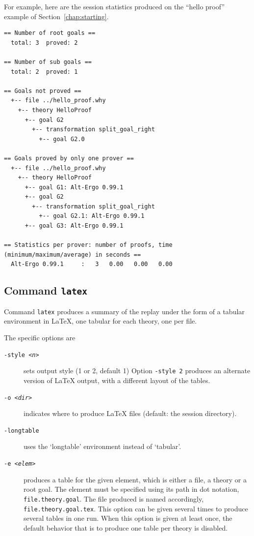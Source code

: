 For example, here are the session statistics produced on the ``hello
proof'' example of Section~\ref{chap:starting}.
{\footnotesize
\begin{verbatim}
== Number of root goals ==
  total: 3  proved: 2

== Number of sub goals ==
  total: 2  proved: 1

== Goals not proved ==
  +-- file ../hello_proof.why
    +-- theory HelloProof
      +-- goal G2
        +-- transformation split_goal_right
          +-- goal G2.0

== Goals proved by only one prover ==
  +-- file ../hello_proof.why
    +-- theory HelloProof
      +-- goal G1: Alt-Ergo 0.99.1
      +-- goal G2
        +-- transformation split_goal_right
          +-- goal G2.1: Alt-Ergo 0.99.1
      +-- goal G3: Alt-Ergo 0.99.1

== Statistics per prover: number of proofs, time (minimum/maximum/average) in seconds ==
  Alt-Ergo 0.99.1     :   3   0.00   0.00   0.00
 \end{verbatim}
}

\subsection{Command \texttt{latex}}

Command \texttt{latex} produces a summary of the replay under the form
of a tabular environment in LaTeX, one tabular for each theory, one
per file.

The specific options are
\begin{description}
\item[\texttt{-style \textsl{<n>}}] sets output style (1 or 2, default 1)
  Option \texttt{-style 2} produces an alternate version of LaTeX
  output, with a different layout of the tables.
\item[\texttt{-o \textsl{<dir>}}] indicates where
  to produce LaTeX files (default: the session directory).
\item[\texttt{-longtable}] uses the `longtable' environment instead of
  `tabular'.
\item[\texttt{-e \textsl{<elem>}}] produces a table for the given element, which is
  either a file, a theory or a root goal. The element must be specified
  using its path in dot notation, \eg \verb|file.theory.goal|. The
  file produced is named accordingly,
  \eg \verb|file.theory.goal.tex|.  This option can be given several
  times to produce several tables in one run. When this option is
  given at least once, the default behavior that is to produce one
  table per theory is disabled.
\end{description}

